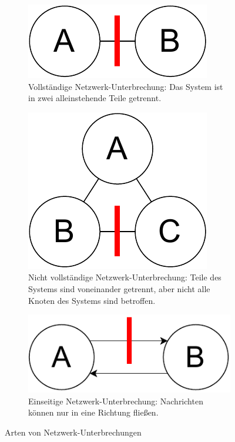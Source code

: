 \documentclass[12pt,a4paper]{report}
\begin{document}
\begin{figure}[H]
	\centering
	\begin{subfigure}{.495\textwidth}
		\centering
		\includegraphics[width=.8\linewidth]{img/ditm-Partitions-full.pdf}
		\caption{Vollständige Netzwerk-Unterbrechung: Das System ist in zwei alleinstehende Teile getrennt.
			\cite{analysis_of_network_partition_failures}}
		\label{fig:full_partition}
	\end{subfigure}
	\begin{subfigure}{.495\textwidth}
		\centering
		\includegraphics[width=.85\linewidth]{img/ditm-Partitions-partial.pdf}
		\caption{Nicht vollständige Netzwerk-Unterbrechung: Teile des Systems sind voneinander getrennt, aber nicht alle Knoten
			des Systems sind betroffen. \cite{analysis_of_network_partition_failures}}
		\label{fig:partial_partition}
	\end{subfigure}
	\begin{subfigure}{.495\textwidth}
		\centering
		\includegraphics[width=\linewidth]{img/ditm-Partitions-simplex.pdf}
		\caption{Einseitige Netzwerk-Unterbrechung: Nachrichten können nur in eine Richtung fließen.
			\cite{analysis_of_network_partition_failures}}
		\label{fig:simplex_partition}
	\end{subfigure}
	\caption{Arten von Netzwerk-Unterbrechungen}
	\label{fig:partition_types}
\end{figure}
\end{document}
